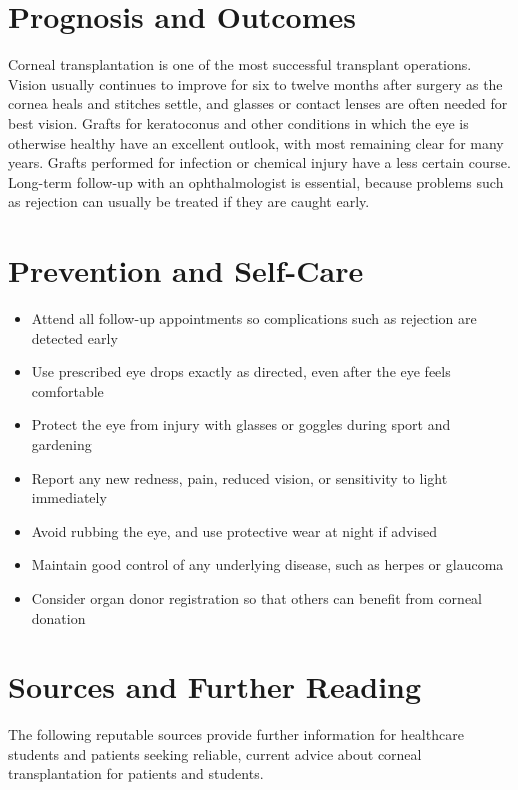\section*{Prognosis and Outcomes}
Corneal transplantation is one of the most successful transplant operations. Vision usually continues to improve for six to twelve months after surgery as the cornea heals and stitches settle, and glasses or contact lenses are often needed for best vision. Grafts for keratoconus and other conditions in which the eye is otherwise healthy have an excellent outlook, with most remaining clear for many years. Grafts performed for infection or chemical injury have a less certain course. Long-term follow-up with an ophthalmologist is essential, because problems such as rejection can usually be treated if they are caught early.

\section*{Prevention and Self-Care}
\begin{itemize}
    \item Attend all follow-up appointments so complications such as rejection are detected early
    \item Use prescribed eye drops exactly as directed, even after the eye feels comfortable
    \item Protect the eye from injury with glasses or goggles during sport and gardening
    \item Report any new redness, pain, reduced vision, or sensitivity to light immediately
    \item Avoid rubbing the eye, and use protective wear at night if advised
    \item Maintain good control of any underlying disease, such as herpes or glaucoma
    \item Consider organ donor registration so that others can benefit from corneal donation
\end{itemize}

\section*{Sources and Further Reading}
The following reputable sources provide further information for healthcare students and patients seeking reliable, current advice about corneal transplantation for patients and students.

